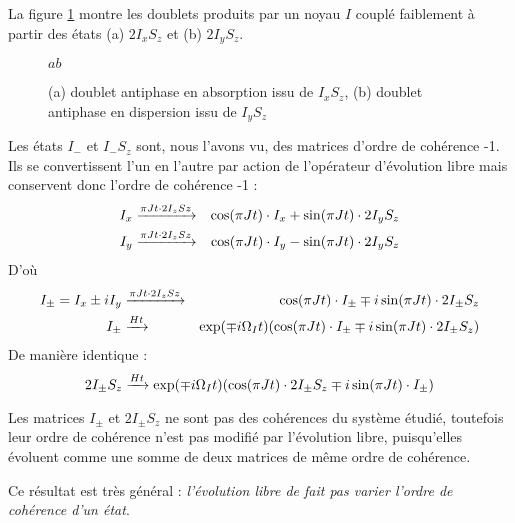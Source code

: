 La figure \ref{fig:ixysz-is} montre les doublets produits par un noyau
$I$ couplé faiblement à partir des états (a) $2I_xS_z$ et (b) $2I_yS_z$.

\begin{figure}[hbt]
\begin{center}
$a$\hspace{1.5in}\hspace{1cm}$b$\hspace{1.5in}$\mbox{ }$\\
 \hspace{1cm}
\end{center}
\caption[Doublets antiphases produits par un système $IS$]{
\label{fig:ixysz-is}
(a) doublet antiphase en absorption issu de $I_xS_z$,
(b) doublet antiphase en dispersion issu de $I_yS_z$}
\end{figure}

Les états $I_-$ et $I_-S_z$ sont, nous l'avons vu, des matrices
d'ordre de cohérence -1.
Ils se convertissent l'un en l'autre par action de l'opérateur
d'évolution libre mais conservent donc l'ordre de cohérence -1 :
\begin{eqnarray}
I_x & \xrightarrow{\pi J t \cdot 2I_zSz} &
\cos(\pi J t) \cdot I_x + \sin(\pi J t) \cdot 2I_yS_z \\ 
I_y & \xrightarrow{\pi J t \cdot 2I_zSz} &
\cos(\pi J t) \cdot I_y - \sin(\pi J t) \cdot 2I_yS_z
\end{eqnarray}
D'où
\begin{eqnarray}
I_{\pm} = I_x \pm iI_y & \xrightarrow{\pi J t \cdot 2I_zSz} &
\cos(\pi J t) \cdot I_{\pm} \mp i \sin(\pi J t) \cdot 2I_{\pm}S_z \\
\label{eqn:evolipm-is} I_{\pm} & \xrightarrow{Ht} &
\exp(\mp i \Omega_I t)(\cos(\pi J t) \cdot I_{\pm} \mp i \sin(\pi J t) \cdot 2I_{\pm}S_z)
\end{eqnarray}
De manière identique :
\begin{equation}
\label{eqn:evolipmsz-is} 2I_{\pm}S_z \xrightarrow{Ht}
\exp(\mp i \Omega_I t)(\cos(\pi J t) \cdot 2I_{\pm}S_z \mp i \sin(\pi J t) \cdot I_{\pm})
\end{equation}

Les matrices $I_{\pm}$ et $2I_{\pm}S_z$ ne sont pas des cohérences du 
système étudié, toutefois leur ordre de cohérence n'est pas modifié
par l'évolution libre, puisqu'elles évoluent comme une somme de
deux matrices de même ordre de cohérence.

Ce résultat est très général : \emph{l'évolution libre de fait pas varier
l'ordre de cohérence d'un état}.

